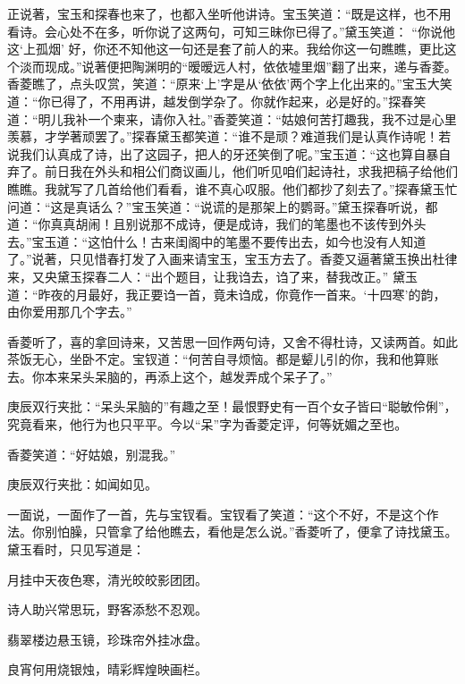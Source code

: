 \begin{parag}


    正说著，宝玉和探春也来了，也都入坐听他讲诗。宝玉笑道：“既是这样，也不用看诗。会心处不在多，听你说了这两句，可知三昧你已得了。”黛玉笑道： “你说他这‘上孤烟’ 好，你还不知他这一句还是套了前人的来。我给你这一句瞧瞧，更比这个淡而现成。”说著便把陶渊明的“暧暧远人村，依依墟里烟”翻了出来，递与香菱。香菱瞧了，点头叹赏，笑道：“原来‘上’字是从‘依依’两个字上化出来的。”宝玉大笑道：“你已得了，不用再讲，越发倒学杂了。你就作起来，必是好的。”探春笑道：“明儿我补一个柬来，请你入社。”香菱笑道：“姑娘何苦打趣我，我不过是心里羡慕，才学著顽罢了。”探春黛玉都笑道：“谁不是顽？难道我们是认真作诗呢！若说我们认真成了诗，出了这园子，把人的牙还笑倒了呢。”宝玉道：“这也算自暴自弃了。前日我在外头和相公们商议画儿，他们听见咱们起诗社，求我把稿子给他们瞧瞧。我就写了几首给他们看看，谁不真心叹服。他们都抄了刻去了。”探春黛玉忙问道：“这是真话么？”宝玉笑道：“说谎的是那架上的鹦哥。”黛玉探春听说，都道：“你真真胡闹！且别说那不成诗，便是成诗，我们的笔墨也不该传到外头去。”宝玉道：“这怕什么！古来闺阁中的笔墨不要传出去，如今也没有人知道了。”说著，只见惜春打发了入画来请宝玉，宝玉方去了。香菱又逼著黛玉换出杜律来，又央黛玉探春二人：“出个题目，让我诌去，诌了来，替我改正。” 黛玉道：“昨夜的月最好，我正要诌一首，竟未诌成，你竟作一首来。‘十四寒’的韵，由你爱用那几个字去。”
\end{parag}


\begin{parag}


    香菱听了，喜的拿回诗来，又苦思一回作两句诗，又舍不得杜诗，又读两首。如此茶饭无心，坐卧不定。宝钗道：“何苦自寻烦恼。都是颦儿引的你，我和他算账去。你本来呆头呆脑的，再添上这个，越发弄成个呆子了。”\begin{note}庚辰双行夹批：“呆头呆脑的”有趣之至！最恨野史有一百个女子皆曰“聪敏伶俐”，究竟看来，他行为也只平平。今以“呆”字为香菱定评，何等妩媚之至也。\end{note}香菱笑道：“好姑娘，别混我。”\begin{note}庚辰双行夹批：如闻如见。\end{note}一面说，一面作了一首，先与宝钗看。宝钗看了笑道：“这个不好，不是这个作法。你别怕臊，只管拿了给他瞧去，看他是怎么说。”香菱听了，便拿了诗找黛玉。黛玉看时，只见写道是：
\end{parag}

\begin{poem}
    \begin{pl}

        月挂中天夜色寒，清光皎皎影团团。
    \end{pl}
    \begin{pl}

        诗人助兴常思玩，野客添愁不忍观。
    \end{pl}
    \begin{pl}

        翡翠楼边悬玉镜，珍珠帘外挂冰盘。
    \end{pl}
    \begin{pl}

        良宵何用烧银烛，晴彩辉煌映画栏。
    \end{pl}
\end{poem}

